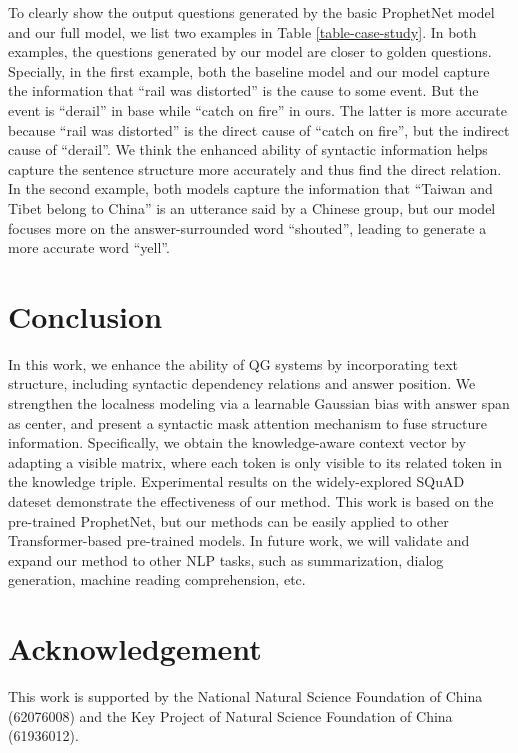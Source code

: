 \documentclass[11pt]{article}
\begin{document}
To clearly show the output questions generated by the basic ProphetNet model and our full model, we list two examples in 
Table \ref{table-case-study}.
In both examples, the questions generated by our model are closer to golden questions. Specially, in the first example, both the baseline model and our model capture the information that ``rail was distorted'' is the cause to some event. But the event is ``derail'' in base while ``catch on fire'' in ours. The latter is more accurate because ``rail was distorted'' is the direct cause of ``catch on fire'', but the indirect cause of ``derail''. We think the enhanced ability of syntactic information helps capture the sentence structure more accurately and thus find the direct relation. In the second example, both models capture the information that ``Taiwan and Tibet belong to China'' is an utterance said by a Chinese group, but our model focuses more on the answer-surrounded word ``shouted'', leading to generate a more accurate word ``yell''.




\section{Conclusion}
In this work, we enhance the ability of QG systems by incorporating text structure, including syntactic dependency relations and answer position. We strengthen the localness modeling via a learnable Gaussian bias with answer span as center, and present a syntactic mask attention mechanism to fuse structure information. Specifically, we obtain the knowledge-aware context vector by adapting a visible matrix, where each token is only visible to its related token in the knowledge triple. Experimental results on the widely-explored SQuAD dateset demonstrate the effectiveness of our method. 
This work is based on the pre-trained ProphetNet, but our methods can be easily applied to other Transformer-based pre-trained models. In future work, we will validate and expand our method to other NLP tasks, such as summarization, dialog generation, machine reading comprehension, etc.

\section*{Acknowledgement}
This work is supported by the National Natural Science Foundation of  China  (62076008) and the Key Project of Natural Science Foundation of China (61936012).







\end{document}
